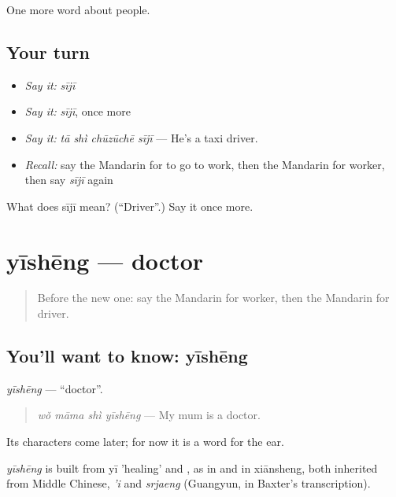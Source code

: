 \begin{grammarlens}[title={What you've built}]
One more word about people.
\end{grammarlens}

\subsection*{Your turn}
\begin{itemize}
\raggedright
  \item \emph{Say it:} \emph{sījī}
  \item \emph{Say it:} \emph{sījī}, once more
  \item \emph{Say it:} \emph{tā shì chūzūchē sījī} — He's a taxi driver.
  \item \emph{Recall:} say the Mandarin for to go to work, then the Mandarin for worker, then say \emph{sījī} again
\end{itemize}

\begin{tcolorbox}[breakable,colback=teal!4,colframe=teal!35!black,title={Before you move on}]
What does sījī mean? (\textquotedblleft{}Driver\textquotedblright{}.) Say it once more.
\end{tcolorbox}
\section[yīshēng]{yīshēng — doctor}

\label{lesson:ZH-C80-yisheng}



\begin{quote}
Before the new one: say the Mandarin for worker, then the Mandarin for driver.
\end{quote}

\subsection*{You'll want to know: yīshēng}
\emph{yīshēng} — \textquotedblleft{}doctor\textquotedblright{}.

\begin{quote}
\emph{wǒ māma shì yīshēng} — My mum is a doctor.
\end{quote}

Its characters come later; for now it is a word for the ear.

\begin{cousinweb}
\emph{yīshēng} is built from yī 'healing' and , as in  and in xiānsheng, both inherited from Middle Chinese, \emph{'i} and \emph{srjaeng} (Guangyun, in Baxter's transcription).
\end{cousinweb}

